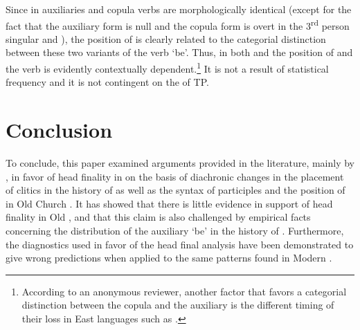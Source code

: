 \documentclass[output=paper,modfonts,newtxmath,hidelinks]{langscibook}
\begin{document}
\ea \label{11:ex28}
	\label{11:ex28a}
	\label{11:ex28b}
	\label{11:ex28c}
	\z
\z
Since in  auxiliaries and copula verbs are morphologically identical (except for the fact that the auxiliary form is null and the copula form is overt in the 3\textsuperscript{rd} person singular and ), the position of  is clearly related to the categorial distinction between these two variants of the verb `be'. Thus, in both  and  the position of  and the verb is evidently contextually dependent.\footnote{\label{11:fn6}According to an anonymous reviewer, another factor that favors a categorial distinction between the copula and the auxiliary is the different timing of their loss in East  languages such as .} It is not a result of statistical frequency and it is not contingent on the  of TP. 

\section{Conclusion} \label{11:s4}

To conclude, this paper examined arguments provided in the literature, mainly by \citet{pancheva2005,pancheva2008}, in favor of head finality in  on the basis of diachronic changes in the placement of clitics in the history of  as well as the syntax of participles and the position of  in Old Church . It has showed that there is little evidence in support of head finality in Old , and that this claim is also challenged by empirical facts concerning the distribution of the auxiliary `be' in the history of . Furthermore, the diagnostics used in favor of the head final analysis have been demonstrated to give wrong predictions when applied to the same patterns found in Modern .
\end{document}
